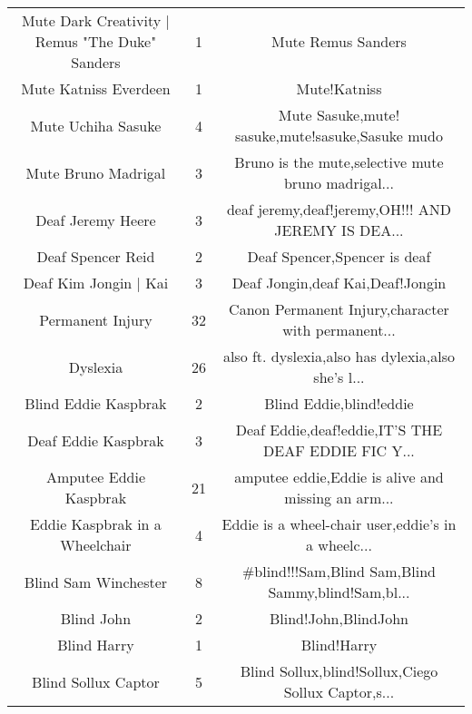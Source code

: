 \begin{table}[h!]
{\begin{tabular}{|c|c|c|}
   Mute Dark Creativity | Remus "The Duke" Sanders &      1 &                                 Mute Remus Sanders \\
                             Mute Katniss Everdeen &      1 &                                       Mute!Katniss \\
                                Mute Uchiha Sasuke &      4 &   Mute Sasuke,mute! sasuke,mute!sasuke,Sasuke mudo \\
                               Mute Bruno Madrigal &      3 & Bruno is the mute,selective mute bruno madrigal... \\
                                 Deaf Jeremy Heere &      3 & deaf jeremy,deaf!jeremy,OH!!! AND JEREMY IS DEA... \\
                                 Deaf Spencer Reid &      2 &                       Deaf Spencer,Spencer is deaf \\
                             Deaf Kim Jongin | Kai &      3 &                   Deaf Jongin,deaf Kai,Deaf!Jongin \\
                                  Permanent Injury &     32 & Canon Permanent Injury,character with permanent... \\
                                          Dyslexia &     26 & also ft. dyslexia,also has dylexia,also she's l... \\
                              Blind Eddie Kaspbrak &      2 &                            Blind Eddie,blind!eddie \\
                               Deaf Eddie Kaspbrak &      3 & Deaf Eddie,deaf!eddie,IT'S THE DEAF EDDIE FIC Y... \\
                            Amputee Eddie Kaspbrak &     21 & amputee eddie,Eddie is alive and missing an arm... \\
                    Eddie Kaspbrak in a Wheelchair &      4 & Eddie is a wheel-chair user,eddie's in a wheelc... \\
                              Blind Sam Winchester &      8 & \#blind!!!Sam,Blind Sam,Blind Sammy,blind!Sam,bl... \\
                                        Blind John &      2 &                               Blind!John,BlindJohn \\
                                       Blind Harry &      1 &                                        Blind!Harry \\
                               Blind Sollux Captor &      5 & Blind Sollux,blind!Sollux,Ciego Sollux Captor,s... \\

\end{tabular}}
\end{table}

